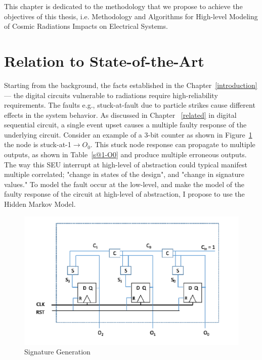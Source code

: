
This chapter is dedicated to the methodology that we propose to achieve the objectives of this thesis, i.e. Methodology and Algorithms for High-level Modeling of Cosmic Radiations Impacts on Electrical Systems.


\label{approach}
\section{Relation to State-of-the-Art}
Starting from the background, the facts established in the Chapter~\ref{introduction}--- the digital circuits vulnerable to radiations require high-reliability requirements. The faults e.g., stuck-at-fault due to particle strikes cause different effects in the system behavior. As discussed in Chapter ~\ref{related} in digital sequential circuit, a single event upset causes a multiple faulty response of the underlying circuit. Consider an example of  a 3-bit counter as shown in Figure~\ref{fig:counter} the node is stuck-at-1$\rightarrow O_0$. This stuck node response can propagate to multiple outputs, as shown in Table~\ref{s@1-O0} and produce multiple erroneous outputs. The way this SEU interrupt at high-level of abstraction could typical manifest multiple correlated; "change in states of the design", and "change in signature values." To model the fault occur at the low-level, and make the model of the faulty response of the circuit at high-level of abstraction, I propose to use the Hidden Markov Model. 



\begin{figure}[tb!]

 \centering
  \captionsetup{justification=centering}    
   \includegraphics[scale=0.6]{Figures/counter.png}
   \caption{Signature Generation}
\label{fig:counter}
\end{figure}




